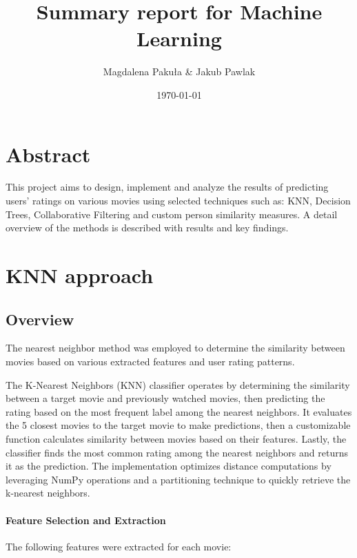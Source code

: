 \documentclass[a4paper,10pt]{article}
\title{Summary report for Machine Learning}
\author{Magdalena Pakuła \& Jakub Pawlak}
\date{\today}
\begin{document}
\maketitle

\section*{Abstract}
This project aims to design, implement and analyze the results of predicting
users' ratings on various movies using selected techniques such as: KNN, Decision Trees,
Collaborative Filtering and custom person similarity measures.
A detail overview of the methods is described with results and key findings.

\tableofcontents
\newpage

\section{KNN approach}
\subsection{Overview}
The nearest neighbor method was employed to determine the similarity
between movies based on various extracted features and user rating patterns.

The K-Nearest Neighbors (KNN) classifier operates by determining the
similarity between a target movie and previously watched movies,
then predicting the rating based on the most frequent label among
the nearest neighbors.
It evaluates the 5 closest movies to the target movie to make predictions, then
a customizable function calculates similarity between movies based on their features.
Lastly, the classifier finds the most common rating among the nearest
neighbors and returns it as the prediction.
The implementation optimizes distance computations by leveraging
NumPy operations and a partitioning technique to quickly retrieve the k-nearest
neighbors.

\paragraph{Feature Selection and Extraction}
The following features were extracted for each movie:
\end{document}
